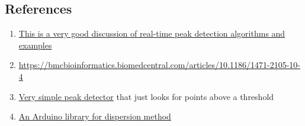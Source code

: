 \subsection{References}
\begin{enumerate}
    \item \href{https://stackoverflow.com/questions/22583391/peak-signal-detection-in-realtime-timeseries-data}
                {This is a very good discussion of real-time peak detection algorithms and examples}
    \item \href{https://bmcbioinformatics.biomedcentral.com/articles/10.1186/1471-2105-10-4}
                {https://bmcbioinformatics.biomedcentral.com/articles/10.1186/1471-2105-10-4}
    \item \href{https://forum.arduino.cc/t/detection-of-a-vibration-peak/423080/9}{Very simple peak detector} that just
                looks for points above a threshold
    \item \href{https://github.com/leandcesar/PeakDetection}{An Arduino library for dispersion method}
\end{enumerate}
